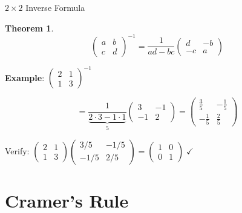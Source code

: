\documentclass[10pt]{beamer}
\theoremstyle{definition}
\newtheorem{thm}{Theorem}[section]
\begin{document}
\begin{frame}{$2\times 2$ Inverse Formula}

\begin{thm}
$$\begin{pmatrix}a&b\\c&d\end{pmatrix}^{-1} = \frac{1}{ad-bc}\begin{pmatrix}d&-b\\-c&a\end{pmatrix}$$
\end{thm}

\vfill

\textbf{Example}: $\begin{pmatrix}2&1\\1&3\end{pmatrix}^{-1}$

$$= \frac{1}{\underbrace{2\cdot3 - 1\cdot1}_{5}}\begin{pmatrix}3&-1\\-1&2\end{pmatrix} = \begin{pmatrix}\frac{3}{5}&-\frac{1}{5}\\[4pt]-\frac{1}{5}&\frac{2}{5}\end{pmatrix}$$

\vfill

Verify: $\begin{pmatrix}2&1\\1&3\end{pmatrix}\begin{pmatrix}3/5&-1/5\\-1/5&2/5\end{pmatrix} = \begin{pmatrix}1&0\\0&1\end{pmatrix}\;\checkmark$

\end{frame}


\section{Cramer's Rule}
\end{document}
